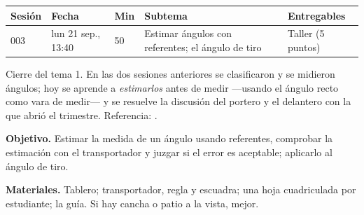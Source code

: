 \documentclass[11pt]{article}
\begin{document}
\encabezado*

\begin{center}
{\renewcommand{\arraystretch}{1.3}
\begin{tabularx}{\linewidth}{@{}l l l X l@{}}
  \toprule
  \textbf{Sesión} & \textbf{Fecha} & \textbf{Min} & \textbf{Subtema} & \textbf{Entregables}\\
  \midrule
  003 & lun 21 sep., 13:40 & 50 & Estimar ángulos con referentes; el ángulo de tiro
      & Taller (5 puntos)\\
  \bottomrule
\end{tabularx}}
\end{center}

Cierre del tema 1. En las dos sesiones anteriores se clasificaron y se midieron ángulos; hoy
se aprende a \emph{estimarlos} antes de medir —usando el ángulo recto como vara de medir— y se
resuelve la discusión del portero y el delantero con la que abrió el trimestre.
Referencia: .


\textbf{Objetivo.} Estimar la medida de un ángulo usando referentes, comprobar la estimación
con el transportador y juzgar si el error es aceptable; aplicarlo al ángulo de tiro.

\textbf{Materiales.} Tablero; transportador, regla y escuadra; una hoja cuadriculada por
estudiante; la guía. Si hay cancha o patio a la vista, mejor.
\end{document}
